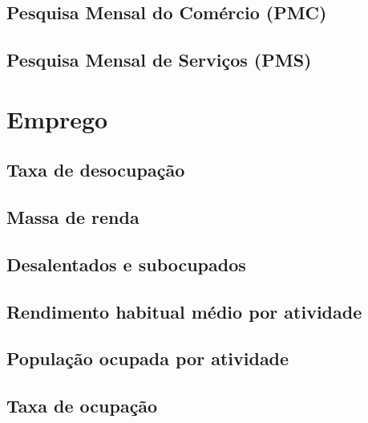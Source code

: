 \documentclass[11pt]{article}
\begin{document}
\subsection{Pesquisa Mensal do Comércio (PMC)}
\label{sec:orgdcf9915}


\subsection{Pesquisa Mensal de Serviços (PMS)}
\label{sec:org77c7862}

\section{Emprego}
\label{sec:orgb1af572}



\subsection{Taxa de desocupação}
\label{sec:org469d2ca}


\subsection{Massa de renda}
\label{sec:org0bbd534}


\subsection{Desalentados e subocupados}
\label{sec:orgc4db9c1}

\subsection{Rendimento habitual médio por atividade}
\label{sec:org74e6417}

\subsection{População ocupada por atividade}
\label{sec:orgc1e62f1}



\subsection{Taxa de ocupação}
\label{sec:orgc74def3}
\end{document}
